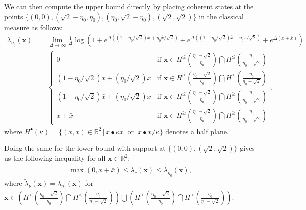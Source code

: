 \documentclass[a4paper,11pt]{article}
\theoremstyle{plain}
\theoremstyle{definition}
\theoremstyle{remark}
\newcommand{\bs}[1]{\boldsymbol{#1}}
\newcommand{\ba}{\begin{equation} \begin{aligned}}
\newcommand{\ea}{\end{aligned} \end{equation}}
\newcommand{\De}{\Delta}
\begin{document}
We can then compute the upper bound directly by placing coherent states at the points $\{(0,0),(\sqrt{2} -\eta_0,\eta_0),(\eta_0,\sqrt{2} - \eta_0),(\sqrt{2},\sqrt{2})\}$ in the classical measure as follows:
\ba
\label{ratetwistgap}
\lambda_{\eta_0}(\bs{x}) &= \lim_{\De \to \infty} \frac{1}{\De} \log\left(1 + e^{\De((1 -\eta_0/\sqrt{2})x +\eta_0 \bar{x}/\sqrt{2}) } + e^{\De((1 -\eta_0/\sqrt{2})\bar{x} +\eta_0 x/\sqrt{2}) } + e^{\De(x+\bar{x})}\right)\\
&=\begin{cases}
    0 & \text{if } \bs{x} \in H^{\leq}(\frac{\eta_0 -\sqrt{2}}{\eta_0}) \bigcap H^{\leq}(\frac{\eta_0}{\eta_0 - \sqrt{2}}) \\
    (1-\eta_0/\sqrt{2})x + (\eta_0/\sqrt{2})\bar{x} & \text{if } \bs{x} \in H^{\geq}(\frac{\eta_0 -\sqrt{2}}{\eta_0}) \bigcap H^{\leq}(\frac{\eta_0}{\eta_0 - \sqrt{2}}) \\
    (1-\eta_0/\sqrt{2})\bar{x} + (\eta_0/\sqrt{2})x & \text{if } \bs{x}\in H^{\leq}(\frac{\eta_0 -\sqrt{2}}{\eta_0}) \bigcap H^{\geq}(\frac{\eta_0}{\eta_0 - \sqrt{2}})
    \\
    x +\bar{x} & \text{if } \bs{x} \in H^{\geq}(\frac{\eta_0 -\sqrt{2}}{\eta_0}) \bigcap H^{\geq}(\frac{\eta_0}{\eta_0 - \sqrt{2}})
\end{cases},
\ea
where $H^{ \bullet}(\kappa) = \{ (x,\bar{x}) \in \mathbb{R}^2 \,|\, \bar{x} \bullet \kappa x \; \;\text{or} \;\; x \bullet \bar{x}/\kappa \}$ denotes a half plane. 

Doing the same for the lower bound with support at $\{(0,0),(\sqrt{2},\sqrt{2})\}$ gives us the following inequality for all $\bs{x} \in\mathbb{R}^2$:
\ba
\max(0,x+\bar{x}) \leq \tilde{\lambda}_{\nu}(\bs{x}) \leq \lambda_{\eta_0}(\bs{x}),
\ea
where $\tilde{\lambda}_{\nu}(\bs{x}) = \lambda_{\eta_0}(\bs{x})$ for $\bs{x} \in \left( H^{\leq}(\frac{\eta_0 -\sqrt{2}}{\eta_0}) \bigcap H^{\leq}(\frac{\eta_0}{\eta_0 - \sqrt{2}})\right) \bigcup \left( H^{\geq}(\frac{\eta_0 -\sqrt{2}}{\eta_0}) \bigcap H^{\geq}(\frac{\eta_0}{\eta_0 - \sqrt{2}}) \right)$.\newline
\end{document}

